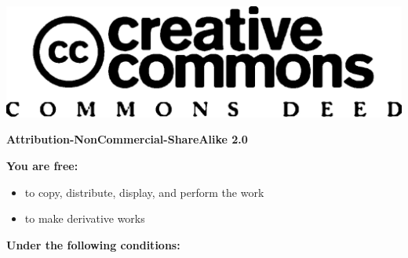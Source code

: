 \documentclass[10pt,american,pdftex]{book}
\begin{document}

\pagebreak

\vspace*{100pt}

\begin{center}\includegraphics{img-cc}

\bigskip

\textbf{Attribution-NonCommercial-ShareAlike 2.0}
\end{center}
\textbf{You are free:}

\begin{itemize}
\item to copy, distribute, display, and perform the work
 
\item to make derivative works
\end{itemize}
\textbf{Under the following conditions:}
\end{document}

